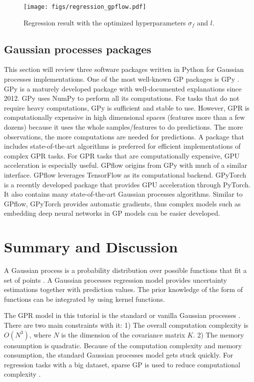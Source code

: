 \documentclass[preprint,12pt]{elsarticle}
\begin{document}
\begin{figure}[h!]
	\centering
		{{\texttt{[image: figs/regression\_gpflow.pdf]}}}
	\caption{Regression result with the optimized hyperparameters $\sigma_f$ and $l$.}
	\label{FIG:12}
\end{figure}

\subsection{Gaussian processes packages}
This section will review three software packages written in Python for Gaussian processes implementations. One of the most well-known GP packages is GPy \cite{de2017gpflow}. GPy is a maturely developed package with well-documented explanations since 2012. GPy uses NumPy to perform all its computations. For tasks that do not require heavy computations, GPy is sufficient and stable to use. However, GPR is computationally expensive in high dimensional spaces (features more than a few dozens) because it uses the whole samples/features to do predictions. The more observations, the more computations are needed for predictions. A package that includes state-of-the-art algorithms is preferred for efficient implementations of complex GPR tasks. For GPR tasks that are computationally expensive, GPU acceleration is especially useful. GPflow \cite{de2017gpflow} origins from GPy with much of a similar interface. GPflow leverages TensorFlow as its computational backend. GPyTorch \cite{gardner2018gpytorch} is a recently developed package that provides GPU acceleration through PyTorch. It also contains many state-of-the-art Gaussian processes algorithms. Similar to GPflow, GPyTorch provides automatic gradients, thus complex models such as embedding deep neural networks in GP models can be easier developed. 

\section{Summary and Discussion}
A Gaussian process is a probability distribution over possible functions that fit a set of points \cite{Rasmussen2006}. A Gaussian processes regression model provides uncertainty estimations together with prediction values. The prior knowledge of the form of functions can be integrated by using kernel functions.

The GPR model in this tutorial is the standard or vanilla Gaussian processes \cite{frigola2013bayesian}. There are two main constraints with it: 1) The overall computation complexity is $O(N^3)$, where $N$ is the dimension of the covariance matrix $K$. 2) The memory consumption is quadratic. Because of the computation complexity and memory consumption, the standard Gaussian processes model gets stuck quickly. For regression tasks with a big dataset, sparse GP is used to reduce computational complexity \cite{liu2020gaussian}.
\end{document}
